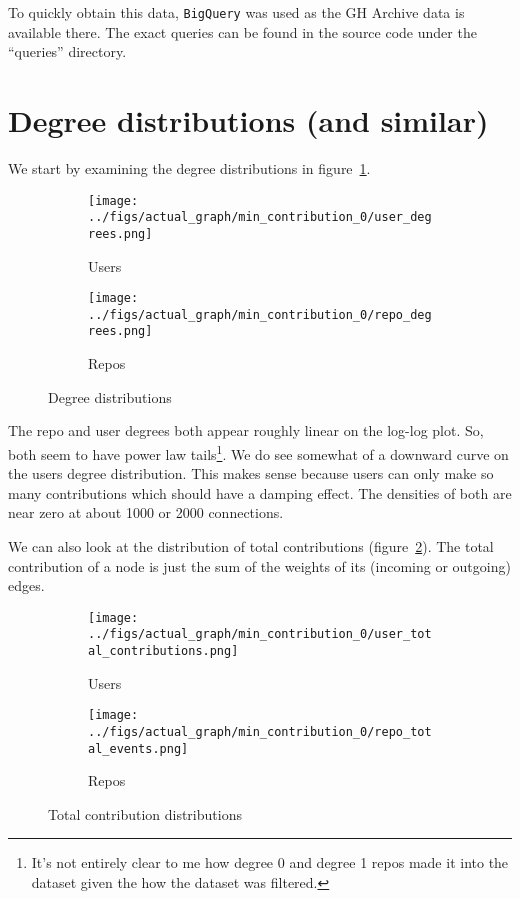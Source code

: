 \documentclass{pset}
\begin{document}
To quickly obtain this data, \texttt{BigQuery} was used as the GH Archive data
is available there.  The exact queries can be found in the source code under
the ``queries'' directory.


\section*{Degree distributions (and similar)}

We start by examining the degree distributions in figure~\ref{fig:degrees}.

\begin{figure}[ht]
\centering
\begin{subfigure}{.5\textwidth}
  \centering
    \texttt{[image: ../figs/actual\_graph/min\_contribution\_0/user\_degrees.png]}
    \caption{Users}
\end{subfigure}%
\begin{subfigure}{.5\textwidth}
  \centering
    \texttt{[image: ../figs/actual\_graph/min\_contribution\_0/repo\_degrees.png]}
    \caption{Repos}
\end{subfigure}
\caption{Degree distributions}\label{fig:degrees}
\end{figure}

The repo and user degrees both appear roughly linear on the log-log plot.
So, both seem to have power law tails\footnote{It's not entirely clear to me
how degree 0 and degree 1 repos made it into the dataset given the how the
dataset was filtered.}.
We do see somewhat of a downward curve on the users degree distribution.
This makes sense because users can only make so many contributions which
should have a damping effect.
The densities of both are near zero at about 1000 or 2000 connections.



We can also look at the distribution of total contributions
(figure~\ref{fig:contributions}). The total contribution of a node is just the
sum of the weights of its (incoming or outgoing) edges.

\begin{figure}[ht]
\centering
\begin{subfigure}{.5\textwidth}
  \centering
    \texttt{[image: ../figs/actual\_graph/min\_contribution\_0/user\_total\_contributions.png]}
    \caption{Users}
\end{subfigure}%
\begin{subfigure}{.5\textwidth}
  \centering
  \texttt{[image: ../figs/actual\_graph/min\_contribution\_0/repo\_total\_events.png]}
    \caption{Repos}
\end{subfigure}
\caption{Total contribution distributions}\label{fig:contributions}
\end{figure}
\end{document}
